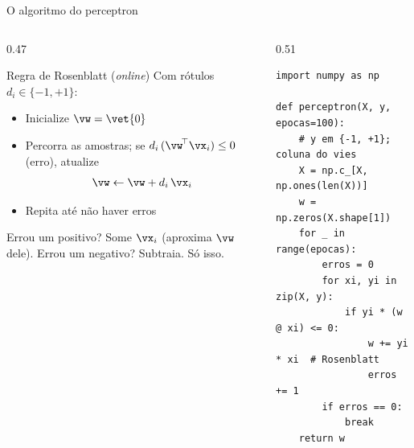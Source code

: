 \documentclass[aspectratio=169, 11pt]{beamer}
\begin{document}
\begin{frame}[fragile]{O algoritmo do perceptron}
  \begin{columns}[T]
    \begin{column}{0.47\textwidth}
      \begin{algbox}{Regra de Rosenblatt (\emph{online})}
        Com rótulos $d_i \in \{-1, +1\}$:
        \begin{itemize}\setlength{\itemsep}{0.2ex}
          \item Inicialize $\vw = \vet{0}$
          \item Percorra as amostras; se $d_i\,(\vw^{\!\top}\vx_i) \le 0$
                (erro), atualize
                \[ \vw \leftarrow \vw + d_i\, \vx_i \]
          \item Repita até não haver erros
        \end{itemize}
      \end{algbox}
      {\small Errou um positivo? Some $\vx_i$ (aproxima $\vw$ dele).
      Errou um negativo? Subtraia. Só isso.}
    \end{column}
    \begin{column}{0.51\textwidth}
\begin{lstlisting}[basicstyle=\ttfamily\scriptsize]
import numpy as np

def perceptron(X, y, epocas=100):
    # y em {-1, +1}; coluna do vies
    X = np.c_[X, np.ones(len(X))]
    w = np.zeros(X.shape[1])
    for _ in range(epocas):
        erros = 0
        for xi, yi in zip(X, y):
            if yi * (w @ xi) <= 0:
                w += yi * xi  # Rosenblatt
                erros += 1
        if erros == 0:
            break
    return w
\end{lstlisting}
    \end{column}
  \end{columns}
\end{frame}
\end{document}
